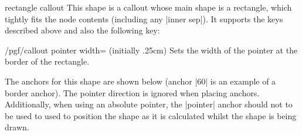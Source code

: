 \begin{shape}{rectangle callout}
    This shape is a callout whose main shape is a rectangle, which tightly fits
    the node contents (including any |inner sep|). It supports the keys
    described above and also the following key:

    \begin{key}{/pgf/callout pointer width= (initially .25cm)}
        Sets the width of the pointer at the border of the rectangle.
    \end{key}

    The anchors for this shape are shown below (anchor |60| is an example of a
    border anchor). The pointer direction is ignored when placing anchors.
    Additionally, when using an absolute pointer, the |pointer| anchor should
    not to be used to used to position the shape as it is calculated whilst the
    shape is being drawn.
\begin{codeexample}[preamble={\usetikzlibrary{shapes.callouts}}]
\Huge
{}
\end{codeexample}
\end{shape}

